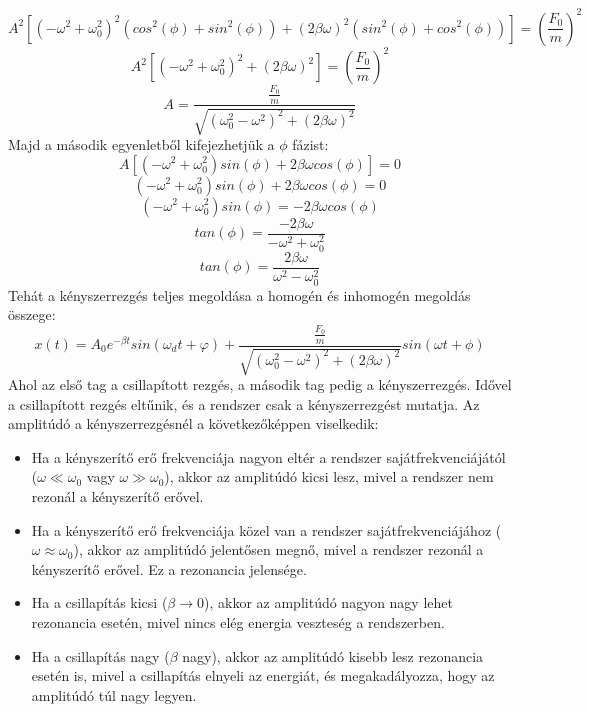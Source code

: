 \documentclass[a4paper,12pt]{article}
\begin{document}
\begin{equation}
    A^2 \left[ \left(-\omega^2 + \omega^2_0\right)^2 \left( cos^2(\phi) + sin^2(\phi) \right) + \left(2\beta \omega\right)^2 \left( sin^2(\phi) + cos^2(\phi) \right) \right] = \left(\frac{F_0}{m}\right)^2
\end{equation}
\begin{equation}
    A^2 \left[ \left(-\omega^2 + \omega^2_0\right)^2 + \left(2\beta \omega\right)^2 \right] = \left(\frac{F_0}{m}\right)^2
\end{equation}
\begin{equation}
    A = \frac{\frac{F_0}{m}}{\sqrt{(\omega_0^2 - \omega^2)^2 + (2\beta \omega)^2}}
\end{equation}
Majd a második egyenletből kifejezhetjük a $\phi$ fázist:
\begin{equation}
    A\left[\left( - \omega^2 + \omega_0^2  \right) sin(\phi) + 2\beta  \omega cos(\phi)\right] = 0
\end{equation}
\begin{equation}
    \left( - \omega^2 + \omega_0^2  \right) sin(\phi) + 2\beta  \omega cos(\phi) = 0
\end{equation}
\begin{equation}
    \left( - \omega^2 + \omega_0^2  \right) sin(\phi) = - 2\beta  \omega cos(\phi)
\end{equation}
\begin{equation}
    tan(\phi) = \frac{- 2\beta  \omega}{- \omega^2 + \omega_0^2}
\end{equation}
\begin{equation}
    tan(\phi) = \frac{2\beta  \omega}{\omega^2 - \omega_0^2}
\end{equation}
Tehát a kényszerrezgés teljes megoldása a homogén és inhomogén megoldás összege:
\begin{equation}
    x(t) = A_0 e^{-\beta t} sin(\omega_d t + \varphi) + \frac{\frac{F_0}{m}}{\sqrt{(\omega_0^2 - \omega^2)^2 + (2\beta \omega)^2}} sin(\omega t + \phi)
\end{equation}
Ahol az első tag a csillapított rezgés, a második tag pedig a kényszerrezgés. Idővel a csillapított rezgés eltűnik, és a rendszer csak a kényszerrezgést mutatja. Az amplitúdó a kényszerrezgésnél a következőképpen viselkedik:
\begin{itemize}
    \item Ha a kényszerítő erő frekvenciája nagyon eltér a rendszer sajátfrekvenciájától ($\omega \ll \omega_0$ vagy $\omega \gg \omega_0$), akkor az amplitúdó kicsi lesz, mivel a rendszer nem rezonál a kényszerítő erővel.
    \item Ha a kényszerítő erő frekvenciája közel van a rendszer sajátfrekvenciájához ($\omega \approx \omega_0$), akkor az amplitúdó jelentősen megnő, mivel a rendszer rezonál a kényszerítő erővel. Ez a rezonancia jelensége.
    \item Ha a csillapítás kicsi ($\beta \to 0$), akkor az amplitúdó nagyon nagy lehet rezonancia esetén, mivel nincs elég energia veszteség a rendszerben.
    \item Ha a csillapítás nagy ($\beta$ nagy), akkor az amplitúdó kisebb lesz rezonancia esetén is, mivel a csillapítás elnyeli az energiát, és megakadályozza, hogy az amplitúdó túl nagy legyen.
\end{itemize}
\end{document}
